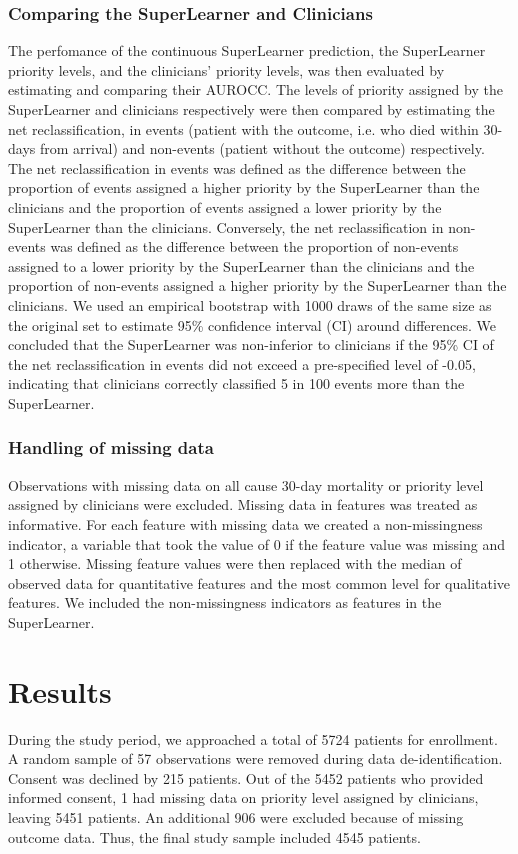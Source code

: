 \documentclass[10pt,letterpaper]{article}\usepackage[]{graphicx}\usepackage[]{color}
\begin{document}
\subsubsection*{Comparing the SuperLearner and Clinicians}
The perfomance of the continuous SuperLearner prediction, the SuperLearner
priority levels, and the clinicians' priority levels, was then evaluated by
estimating and comparing their AUROCC. The levels of priority assigned by the
SuperLearner and clinicians respectively were then compared by estimating the
net reclassification, in events (patient with the outcome, i.e. who died within
30-days from arrival) and non-events (patient without the outcome)
respectively. The net reclassification in events was defined as the difference
between the proportion of events assigned a higher priority by the SuperLearner
than the clinicians and the proportion of events assigned a lower priority by
the SuperLearner than the clinicians. Conversely, the net reclassification in
non-events was defined as the difference between the proportion of non-events
assigned to a lower priority by the SuperLearner than the clinicians and the
proportion of non-events assigned a higher priority by the SuperLearner than the
clinicians. We used an empirical bootstrap with 1000 draws of the same size as
the original set to estimate 95\% confidence interval (CI) around
differences. We concluded that the SuperLearner was non-inferior to clinicians
if the 95\% CI of the net reclassification in events did not exceed a
pre-specified level of -0.05, indicating that clinicians correctly classified 5
in 100 events more than the SuperLearner.

\subsubsection*{Handling of missing data}
Observations with missing data on all cause 30-day mortality or priority level
assigned by clinicians were excluded. Missing data in features was treated as
informative. For each feature with missing data we created a non-missingness
indicator, a variable that took the value of 0 if the feature value was missing
and 1 otherwise. Missing feature values were then replaced with the median of
observed data for quantitative features and the most common level for
qualitative features. We included the non-missingness indicators as features in
the SuperLearner.

\section*{Results}
During the study period, we approached a total of
5724 patients for enrollment. A random sample of
57 observations were removed during data
de-identification. Consent was declined by 215 patients. Out of the
5452 patients who provided informed consent,
1 had
missing data on priority level assigned by clinicians, leaving
5451 patients. An additional
906
were excluded because of missing outcome data. Thus, the final study sample
included 4545 patients.
\end{document}
